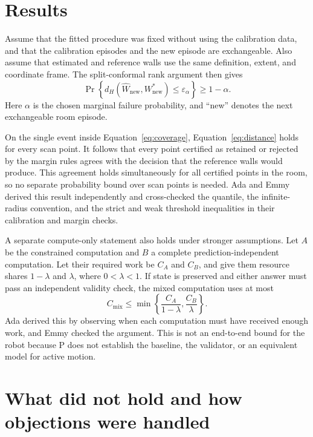\documentclass{article}
\begin{document}
\section{Results}

Assume that the fitted procedure was fixed without using the calibration data, and that the calibration episodes and the new episode are exchangeable. Also assume that estimated and reference walls use the same definition, extent, and coordinate frame. The split-conformal rank argument then gives
\begin{equation}
  \Pr\!\left\{d_H(\widehat W_{\mathrm{new}},W^*_{\mathrm{new}})
  \leq\varepsilon_\alpha\right\}\geq 1-\alpha.
  \label{eq:coverage}
\end{equation}
Here $\alpha$ is the chosen marginal failure probability, and ``new'' denotes the next exchangeable room episode.

On the single event inside Equation~\eqref{eq:coverage}, Equation~\eqref{eq:distance} holds for every scan point. It follows that every point certified as retained or rejected by the margin rules agrees with the decision that the reference walls would produce. This agreement holds simultaneously for all certified points in the room, so no separate probability bound over scan points is needed. Ada and Emmy derived this result independently and cross-checked the quantile, the infinite-radius convention, and the strict and weak threshold inequalities in their calibration and margin checks.

A separate compute-only statement also holds under stronger assumptions. Let $A$ be the constrained computation and $B$ a complete prediction-independent computation. Let their required work be $C_A$ and $C_B$, and give them resource shares $1-\lambda$ and $\lambda$, where $0<\lambda<1$. If state is preserved and either answer must pass an independent validity check, the mixed computation uses at most
\begin{equation}
  C_{\mathrm{mix}}\leq
  \min\left\{\frac{C_A}{1-\lambda},\frac{C_B}{\lambda}\right\}.
\end{equation}
Ada derived this by observing when each computation must have received enough work, and Emmy checked the argument. This is not an end-to-end bound for the robot because P does not establish the baseline, the validator, or an equivalent model for active motion.

\section{What did not hold and how objections were handled}
\end{document}
